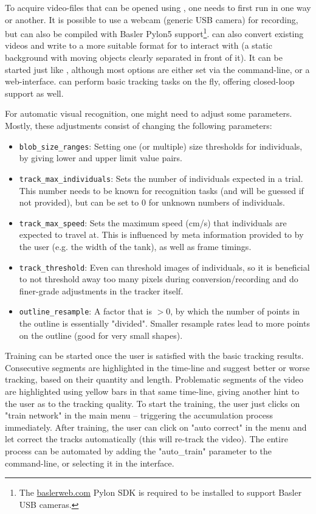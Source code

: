 \documentclass[9pt,lineno]{elife}
\newcommand{\TRex}{\protect\path{TRex}}
\newcommand{\TGrabs}{\protect\path{TGrabs}}
\begin{document}
\begin{appendixbox}
To acquire video-files that can be opened using \TRex{}, one needs to first run \TGrabs{} in one way or another. It is possible to use a webcam (generic USB camera) for recording, but \TGrabs{} can also be compiled with Basler Pylon5 support\footnote{The \href{https://www.baslerweb.com/de/produkte/software/basler-pylon-camera-software-suite/}{baslerweb.com} Pylon SDK is required to be installed to support Basler USB cameras.}. \TGrabs{} can also convert existing videos and write to a more suitable format for \TRex{} to interact with (a static background with moving objects clearly separated in front of it). It can be started just like \TRex{}, although most options are either set via the command-line, or a web-interface. \TGrabs{} can perform basic tracking tasks on the fly, offering closed-loop support as well.

For automatic visual recognition, one might need to adjust some parameters. Mostly, these adjustments consist of changing the following parameters:

\begin{itemize}
    \item \texttt{blob\_size\_ranges}: Setting one (or multiple) size thresholds for individuals, by giving lower and upper limit value pairs.
    \item \texttt{track\_max\_individuals}: Sets the number of individuals expected in a trial. This number needs to be known for recognition tasks (and will be guessed if not provided), but can be set to $0$ for unknown numbers of individuals.
    \item \texttt{track\_max\_speed}: Sets the maximum speed (cm/s) that individuals are expected to travel at. This is influenced by meta information provided to \TGrabs{} by the user (e.g. the width of the tank), as well as frame timings.
    \item \texttt{track\_threshold}: Even \TRex{} can threshold images of individuals, so it is beneficial to not threshold away too many pixels during conversion/recording and do finer-grade adjustments in the tracker itself.
    \item \texttt{outline\_resample}: A factor that is $>0$, by which the number of points in the outline is essentially "divided". Smaller resample rates lead to more points on the outline (good for very small shapes).
\end{itemize}

Training can be started once the user is satisfied with the basic tracking results. Consecutive segments are highlighted in the time-line and suggest better or worse tracking, based on their quantity and length. Problematic segments of the video are highlighted using yellow bars in that same time-line, giving another hint to the user as to the tracking quality. To start the training, the user just clicks on "train network" in the main menu -- triggering the accumulation process immediately. After training, the user can click on "auto correct" in the menu and let \TRex{} correct the tracks automatically (this will re-track the video). The entire process can be automated by adding the "auto\_train" parameter to the command-line, or selecting it in the interface.


\end{appendixbox}
\end{document}
